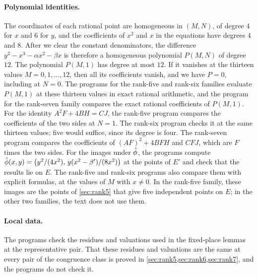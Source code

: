 \paragraph{Polynomial identities.} The coordinates of each rational point are homogeneous in $(M,N)$, of degree $4$ for $x$ and $6$ for $y$, and the coefficients of $x^2$ and $x$ in the equations have degrees $4$ and $8$. After we clear the constant denominators, the difference $y^2-x^3-\alpha x^2-\beta x$ is therefore a homogeneous polynomial $P(M,N)$ of degree $12$. The polynomial $P(M,1)$ has degree at most $12$. If it vanishes at the thirteen values $M=0,1,\dots,12$, then all its coefficients vanish, and we have $P=0$, including at $N=0$. The programs for the rank-five and rank-six families evaluate $P(M,1)$ at these thirteen values in exact rational arithmetic, and the program for the rank-seven family compares the exact rational coefficients of $P(M,1)$. For the identity $A^2F+4BH=CJ$, the rank-five program compares the coefficients of the two sides at $N=1$. The rank-six program checks it at the same thirteen values; five would suffice, since its degree is four. The rank-seven program compares the coefficients of $(AF)^2+4BFH$ and $CFJ$, which are $F$ times the two sides. For the images under $\hat\phi$, the programs compute $\hat\phi(x,y)=\big(y^2/(4x^2),\,y(x^2-\beta')/(8x^2)\big)$ at the points of $E'$ and check that the results lie on $E$. The rank-five and rank-six programs also compare them with explicit formulas, at the values of $M$ with $x\ne0$. In the rank-five family, these images are the points of \cref{sec:rank5} that give five independent points on $E$; in the other two families, the text does not use them.

\paragraph{Local data.} The programs check the residues and valuations used in the fixed-place lemmas at the representative pair. That these residues and valuations are the same at every pair of the congruence class is proved in \cref{sec:rank5,sec:rank6,sec:rank7}, and the programs do not check it.

